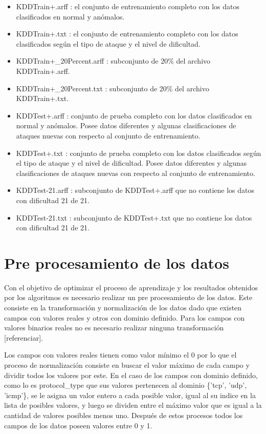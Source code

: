 \begin{itemize}
    \item KDDTrain+.arff : el conjunto de entrenamiento completo con los datos clasificados en normal y anómalos.
    \item KDDTrain+.txt : el conjunto de entrenamiento completo con los datos clasificados según el tipo de ataque y el nivel de dificultad.
    \item KDDTrain+\_20Percent.arff : subconjunto de 20\% del archivo KDDTrain+.arff.
    \item KDDTrain+\_20Percent.txt : subconjunto de 20\% del archivo KDDTrain+.txt.
    \item KDDTest+.arff : conjunto de prueba completo con los datos clasificados en normal y anómalos. Posee datos diferentes y algunas clasificaciones de ataques nuevas con respecto al conjunto de entrenamiento.
    \item KDDTest+.txt : conjunto de prueba completo con los datos clasificados según el tipo de ataque y el nivel de dificultad. Posee datos diferentes y algunas clasificaciones de ataques nuevas con respecto al conjunto de entrenamiento.
    \item KDDTest-21.arff : subconjunto de KDDTest+.arff que no contiene los datos con dificultad 21 de 21.
    \item KDDTest-21.txt : subconjunto de KDDTest+.txt que no contiene los datos con dificultad 21 de 21.
\end{itemize}

\section{Pre procesamiento de los datos}
Con el objetivo de optimizar el proceso de aprendizaje y los resultados obtenidos por los algoritmos es necesario realizar un pre procesamiento de los datos. Este consiste en la transformación y normalización de los datos dado que existen campos con valores reales y otros con dominio definido. Para los campos con valores binarios reales no es necesario realizar ninguna transformación [referenciar].

Los campos con valores reales tienen como valor mínimo el 0 por lo que el proceso de normalización consiste en buscar el valor máximo de cada campo y dividir todos los valores por este. En el caso de los campos con dominio definido, como lo es protocol\_type que sus valores pertenecen al dominio \{'tcp', 'udp', 'icmp'\}, se le asigna un valor entero a cada posible valor, igual al su indice en la lista de posibles valores, y luego se dividen entre el máximo valor que es igual a la cantidad de valores posibles menos uno. Después de estos procesos todos los campos de los datos poseen valores entre 0 y 1.

